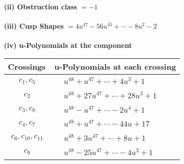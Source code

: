 \documentclass[1p]{elsarticle_modified}
\theoremstyle{definition}
\begin{document}
\flushleft \textbf{(ii) Obstruction class $= -1$}\\~\\
\flushleft \textbf{(iii) Cusp Shapes $= 4 u^{47}-56 u^{45}+\cdots-8 u^2-2$}\\~\\
\newpage\renewcommand{\arraystretch}{1}
\flushleft \textbf{(iv) u-Polynomials at the component}\newline \\
\begin{tabular}{m{50pt}|m{274pt}}
Crossings & \hspace{64pt}u-Polynomials at each crossing \\
\hline $$\begin{aligned}c_{1},c_{5}\end{aligned}$$&$\begin{aligned}
&u^{48}+u^{47}+\cdots+4 u^3+1
\end{aligned}$\\
\hline $$\begin{aligned}c_{2}\end{aligned}$$&$\begin{aligned}
&u^{48}+27 u^{47}+\cdots+28 u^3+1
\end{aligned}$\\
\hline $$\begin{aligned}c_{3},c_{8}\end{aligned}$$&$\begin{aligned}
&u^{48}- u^{47}+\cdots-2 u^4+1
\end{aligned}$\\
\hline $$\begin{aligned}c_{4},c_{7}\end{aligned}$$&$\begin{aligned}
&u^{48}+u^{47}+\cdots-44 u+17
\end{aligned}$\\
\hline $$\begin{aligned}c_{6},c_{10},c_{11}\end{aligned}$$&$\begin{aligned}
&u^{48}+3 u^{47}+\cdots+8 u+1
\end{aligned}$\\
\hline $$\begin{aligned}c_{9}\end{aligned}$$&$\begin{aligned}
&u^{48}-25 u^{47}+\cdots-4 u^2+1
\end{aligned}$\\
\hline
\end{tabular}\\~\\
\end{document}
